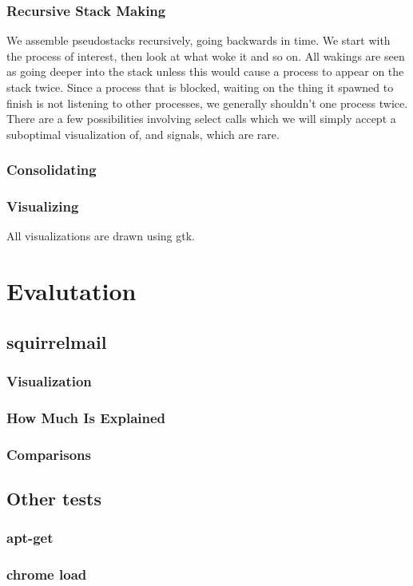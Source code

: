 \documentclass[10pt]{article}
\begin{document}
\subsubsection{Recursive Stack Making}

We assemble pseudostacks recursively, going backwards in time.  We start with the process of interest, then look at what woke it and so on.  All wakings are seen as going deeper into the stack unless this would cause a process to appear on the stack twice.  Since a process that is blocked, waiting on the thing it spawned to finish is not listening to other processes, we generally shouldn't one process twice.  There are a few possibilities involving select calls which we will simply accept a suboptimal visualization of, and signals, which are rare.

\subsubsection{Consolidating}
\subsubsection{Visualizing}

All visualizations are drawn using gtk.

\section{Evalutation}
\subsection{squirrelmail}
\subsubsection{Visualization}
\subsubsection{How Much Is Explained}
\subsubsection{Comparisons}
\subsection{Other tests}
\subsubsection{apt-get}
\subsubsection{chrome load}
\end{document}
